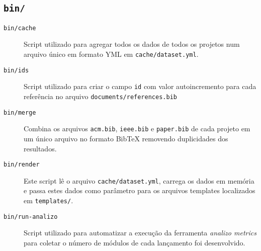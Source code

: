 \subsection{\texttt{bin/}}

\begin{description}
  \item [\texttt{bin/cache}] Script utilizado para agregar todos os dados
  de todos os projetos num arquivo único em formato YML em \texttt{cache/dataset.yml}.




  \item [\texttt{bin/ids}]
    Script utilizado para criar o campo \texttt{id} com valor autoincremento
    para cada referência no arquivo \texttt{documents/references.bib}

  \item [\texttt{bin/merge}]
    Combina os arquivos \texttt{acm.bib}, \texttt{ieee.bib} e
    \texttt{paper.bib} de cada projeto em um único arquivo no formato BibTeX
    removendo duplicidades dos resultados.

  \item [\texttt{bin/render}]
    Este script lê o arquivo \texttt{cache/dataset.yml}, carrega os dados em
    memória e passa estes dados como parâmetro para os arquivos templates
    localizados em \texttt{templates/}.

  \item [\texttt{bin/run-analizo}] 
    Script utilizado para automatizar a execução da ferramenta {\it analizo
    metrics} para coletar o número de módulos de cada lançamento foi
    desenvolvido.

\end{description}

